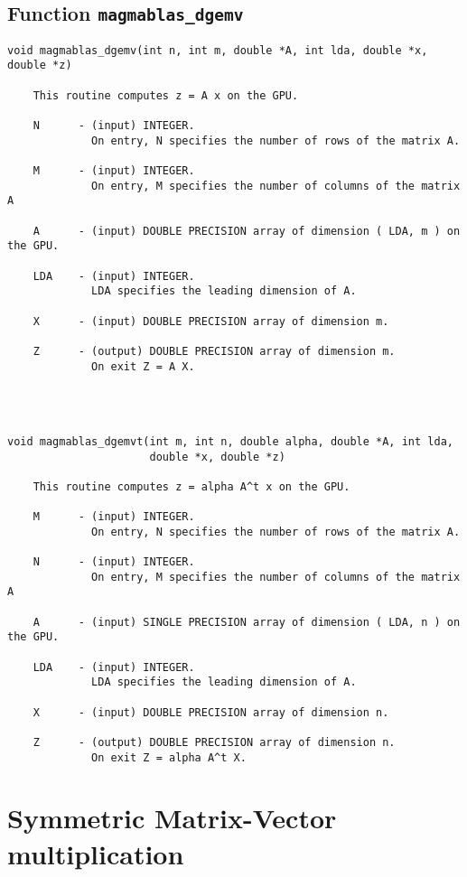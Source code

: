 \documentclass[10pt]{book}
\begin{document}
\newpage
\subsection{Function {\tt {\bf magmablas\_dgemv}}}
\vspace{0.1in}
\begin{verbatim}
void magmablas_dgemv(int n, int m, double *A, int lda, double *x, double *z)

    This routine computes z = A x on the GPU.

    N      - (input) INTEGER.
             On entry, N specifies the number of rows of the matrix A.

    M      - (input) INTEGER.
             On entry, M specifies the number of columns of the matrix A

    A      - (input) DOUBLE PRECISION array of dimension ( LDA, m ) on the GPU.

    LDA    - (input) INTEGER.
             LDA specifies the leading dimension of A.

    X      - (input) DOUBLE PRECISION array of dimension m.

    Z      - (output) DOUBLE PRECISION array of dimension m.
             On exit Z = A X.




void magmablas_dgemvt(int m, int n, double alpha, double *A, int lda,
                      double *x, double *z)

    This routine computes z = alpha A^t x on the GPU.

    M      - (input) INTEGER.
             On entry, N specifies the number of rows of the matrix A.

    N      - (input) INTEGER.
             On entry, M specifies the number of columns of the matrix A

    A      - (input) SINGLE PRECISION array of dimension ( LDA, n ) on the GPU.

    LDA    - (input) INTEGER.
             LDA specifies the leading dimension of A.

    X      - (input) DOUBLE PRECISION array of dimension n.

    Z      - (output) DOUBLE PRECISION array of dimension n.
             On exit Z = alpha A^t X.
\end{verbatim}


\newpage
\section{Symmetric Matrix-Vector multiplication}
\end{document}
